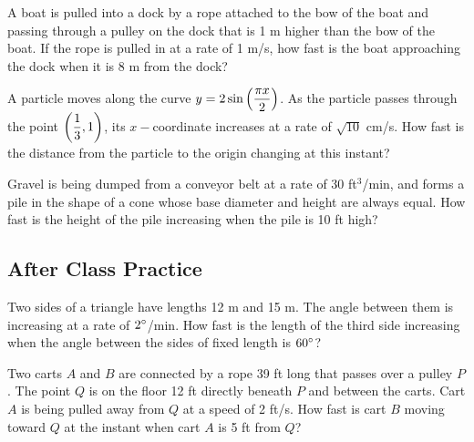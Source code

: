 \documentclass[notes]{subfiles}
\begin{document}
		\begin{ex}
			A boat is pulled into a dock by a rope attached to the bow of the boat and passing through a pulley on the dock that is 1 m higher than the bow of the boat.  If the rope is pulled in at a rate of 1 m/s, how fast is the boat approaching the dock when it is 8 m from the dock?
		\end{ex}
			\newpage
			
		\begin{ex}
			A particle moves along the curve \(y = 2\sin\left( \dfrac{\pi x}{2}\right)\).  As the particle passes through the point \(\left( \dfrac{1}{3},1\right)\), its \(x-\)coordinate increases at a rate of \(\sqrt{10}\) cm/s.  How fast is the distance from the particle to the origin changing at this instant?
		\end{ex}
			
		\begin{ex}
			Gravel is being dumped from a conveyor belt at a rate of 30 ft\(^3\)/min, and forms a pile in the shape of a cone whose base diameter and height are always equal.  How fast is the height of the pile increasing when the pile is 10 ft high?
		\end{ex}
			\newpage
			
	\subsection*{After Class Practice}
		\begin{ex}
			Two sides of a triangle have lengths 12 m and 15 m.  The angle between them is increasing at a rate of \(2^\circ\)/min.  How fast is the length of the third side increasing when the angle between the sides of fixed length is \(60^\circ\)?
		\end{ex}
			
		\begin{ex}
			Two carts \(A\) and \(B\) are connected by a rope 39 ft long that passes over a pulley \(P\).  The point \(Q\) is on the floor 12 ft directly beneath \(P\) and between the carts.  Cart \(A\) is being pulled away from \(Q\) at a speed of 2 ft/s.  How fast is cart \(B\) moving toward \(Q\) at the instant when cart \(A\) is 5 ft from \(Q\)?
		\end{ex}		
			\newpage
\clearpage
\end{document}
